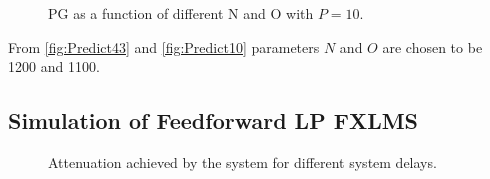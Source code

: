 \begin{figure}[H]
	\centering
	
	\caption{PG as a function of different N and O with $P=10$.}
	\label{fig:Predict10}
\end{figure}

From \autoref{fig:Predict43} and \autoref{fig:Predict10} parameters $N$ and $O$ are chosen to be 1200 and 1100.
\subsection{Simulation of Feedforward LP FXLMS}

\begin{figure}[H]
	\centering
	
	\caption{Attenuation achieved by the system for different system delays.}
	\label{Fig:Reference to noise ratio}
\end{figure}














